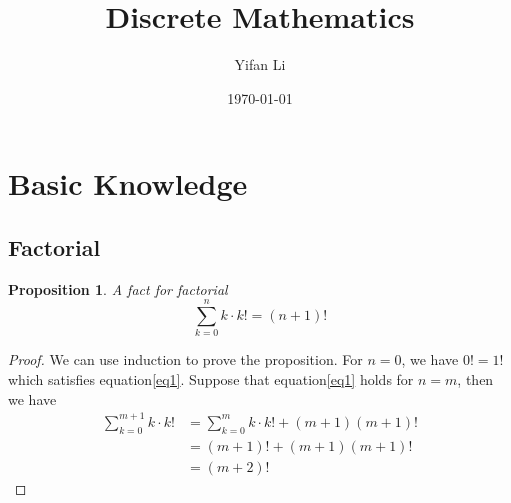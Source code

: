 \documentclass{article}
\title{Discrete Mathematics}
\author{Yifan Li}
\date{\today}
\newtheorem{prop}{\bf Proposition}[section]
\begin{document}
\maketitle

\section{Basic Knowledge}
\subsection{Factorial}
\begin{prop}
    A fact for factorial
    \begin{equation}\label{eq1}
        \sum_{k=0}^nk\cdot k!=(n+1)!
    \end{equation}
\end{prop}

\begin{proof}
    We can use induction to prove the proposition. For $n=0$, we have $0!=1!$ which satisfies equation\eqref{eq1}. Suppose that equation\eqref{eq1} holds for $n=m$, then we have
    \begin{equation*}
        \begin{split}
            \sum^{m+1}_{k=0}k\cdot k!&=\sum^{m}_{k=0}k\cdot k!+(m+1)(m+1)!\\
            &=(m+1)!+(m+1)(m+1)!\\
            &=(m+2)!
        \end{split}
    \end{equation*}
\end{proof}
\end{document}
